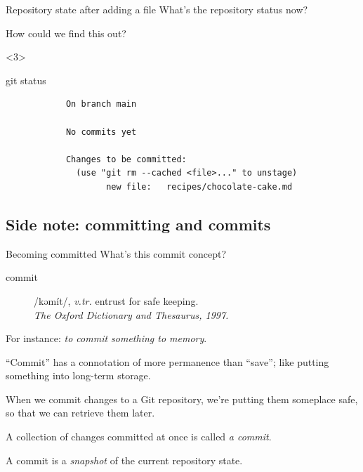 \documentclass{git_course}
\begin{document}
\begin{frame}[fragile]{Repository state after adding a file}
    What's the repository status now?

    How could we find this out?


    \begin{onlyenv}<3>
        \begin{shellcode}
            git status
        \end{shellcode}
        \begin{verbatim}
            On branch main

            No commits yet

            Changes to be committed:
              (use "git rm --cached <file>..." to unstage)
                    new file:   recipes/chocolate-cake.md
        \end{verbatim}
    \end{onlyenv}

\end{frame}

\subsection{Side note: committing and commits}

\begin{frame}[fragile]{Becoming committed}
    What's this commit concept?
    \begin{description}
        \item[commit] /kəmít/, \emph{v.tr.} entrust for safe
            keeping.\\
            \emph{The Oxford Dictionary and Thesaurus, 1997.}
    \end{description}

    For instance: \emph{to commit something to memory}.

    ``Commit'' has a connotation of more permanence than ``save''; like
    putting something into long-term storage.

    When we commit changes to a Git repository, we're putting them someplace
    safe, so that we can retrieve them later.

    A collection of changes committed at once is called \emph{a commit}.

    A commit is a \emph{snapshot} of the current repository state.
\end{frame}
\end{document}
